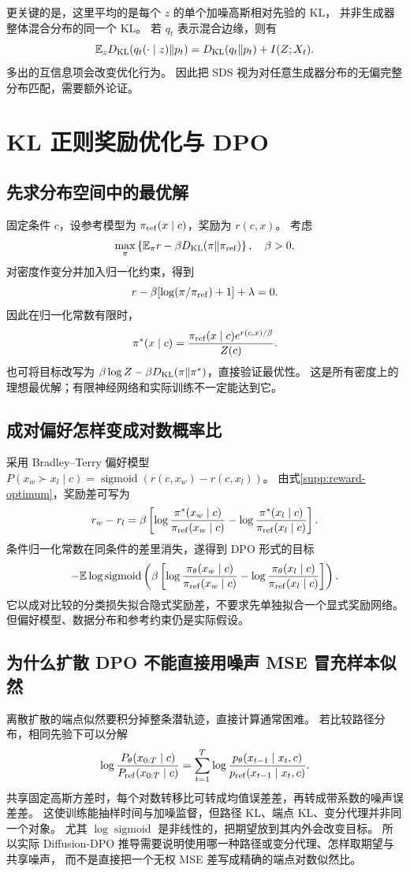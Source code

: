 更关键的是，这里平均的是每个 $z$ 的单个加噪高斯相对先验的 KL，
并非生成器整体混合分布的同一个 KL。
若 $q_t$ 表示混合边缘，则有
\[
\mathbb E_zD_{\rm KL}(q_t(\cdot\mid z)\|p_t)
=D_{\rm KL}(q_t\|p_t)+I(Z;X_t).
\]
多出的互信息项会改变优化行为。
因此把 SDS 视为对任意生成器分布的无偏完整分布匹配，需要额外论证。

\section{KL 正则奖励优化与 DPO}
\subsection{先求分布空间中的最优解}
固定条件 $c$，设参考模型为 $\pi_{\rm ref}(x\mid c)$，奖励为 $r(c,x)$。
考虑
\[
\max_\pi\left\{\mathbb E_\pi r-\beta D_{\rm KL}(\pi\|\pi_{\rm ref})\right\},\quad\beta>0.
\]
对密度作变分并加入归一化约束，得到
\[
r-\beta[\log(\pi/\pi_{\rm ref})+1]+\lambda=0.
\]
因此在归一化常数有限时，
\[
\pi^*(x\mid c)=\frac{\pi_{\rm ref}(x\mid c)e^{r(c,x)/\beta}}{Z(c)}.
\label{supp:reward-optimum}
\]
也可将目标改写为 $\beta\log Z-\beta D_{\rm KL}(\pi\|\pi^*)$，直接验证最优性。
这是所有密度上的理想最优解；有限神经网络和实际训练不一定能达到它。

\subsection{成对偏好怎样变成对数概率比}
采用 Bradley--Terry 偏好模型
$P(x_w\succ x_l\mid c)=\operatorname{sigmoid}(r(c,x_w)-r(c,x_l))$。
由式\eqref{supp:reward-optimum}，奖励差可写为
\[
r_w-r_l=\beta\left[
 \log\frac{\pi^*(x_w\mid c)}{\pi_{\rm ref}(x_w\mid c)}
 -\log\frac{\pi^*(x_l\mid c)}{\pi_{\rm ref}(x_l\mid c)}\right].
\]
条件归一化常数在同条件的差里消失，遂得到 DPO 形式的目标
\[
-\mathbb E\log\operatorname{sigmoid}\left(\beta\left[
 \log\frac{\pi_\theta(x_w\mid c)}{\pi_{\rm ref}(x_w\mid c)}
 -\log\frac{\pi_\theta(x_l\mid c)}{\pi_{\rm ref}(x_l\mid c)}\right]\right).
\]
它以成对比较的分类损失拟合隐式奖励差，不要求先单独拟合一个显式奖励网络。
但偏好模型、数据分布和参考约束仍是实际假设。

\subsection{为什么扩散 DPO 不能直接用噪声 MSE 冒充样本似然}
离散扩散的端点似然要积分掉整条潜轨迹，直接计算通常困难。
若比较路径分布，相同先验下可以分解
\[
\log\frac{P_\theta(x_{0:T}\mid c)}{P_{\rm ref}(x_{0:T}\mid c)}
=\sum_{t=1}^T\log
 \frac{p_\theta(x_{t-1}\mid x_t,c)}{p_{\rm ref}(x_{t-1}\mid x_t,c)}.
\]
共享固定高斯方差时，每个对数转移比可转成均值误差差，再转成带系数的噪声误差差。
这使训练能抽样时间与加噪监督，但路径 KL、端点 KL、变分代理并非同一个对象。
尤其 $\log\operatorname{sigmoid}$ 是非线性的，把期望放到其内外会改变目标。
所以实际 Diffusion-DPO 推导需要说明使用哪一种路径或变分代理、怎样取期望与共享噪声，
而不是直接把一个无权 MSE 差写成精确的端点对数似然比。\cite{theorybook}
